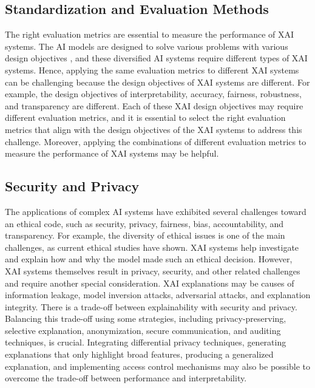 \documentclass[final,5p,times,twocolumn]{elsarticle}
\begin{document}
 
\subsection{Standardization and Evaluation Methods}
The right evaluation metrics are essential to measure the performance of XAI systems. The AI models are designed to solve various problems with various design objectives \cite{lopes2022xai}, and these diversified AI systems require different types of XAI systems. Hence, applying the same evaluation metrics to different XAI systems can be challenging because the design objectives of XAI systems are different. For example, the design objectives of interpretability, accuracy, fairness, robustness, and transparency are different. Each of these XAI design objectives may require different evaluation metrics, and it is essential to select the right evaluation metrics that align with the design objectives of the XAI systems to address this challenge. Moreover, applying the combinations of different evaluation metrics to measure the performance of XAI systems may be helpful.

\subsection{Security and Privacy}
The applications of complex AI systems have exhibited several challenges toward an ethical code, such as security, privacy, fairness, bias, accountability, and transparency. For example, the diversity of ethical issues is one of the main challenges, as current ethical studies have shown. XAI systems help investigate and explain how and why the model made such an ethical decision. However, XAI systems themselves result in privacy, security, and other related challenges and require another special consideration. XAI explanations may be causes of information leakage, model inversion attacks, adversarial attacks, and explanation integrity. There is a trade-off between explainability with security and privacy. Balancing this trade-off using some strategies, including privacy-preserving, selective explanation, anonymization, secure communication, and auditing techniques, is crucial. Integrating differential privacy techniques, generating explanations that only highlight broad features, producing a generalized explanation, and implementing access control mechanisms may also be possible to overcome the trade-off between performance and interpretability.
\end{document}
